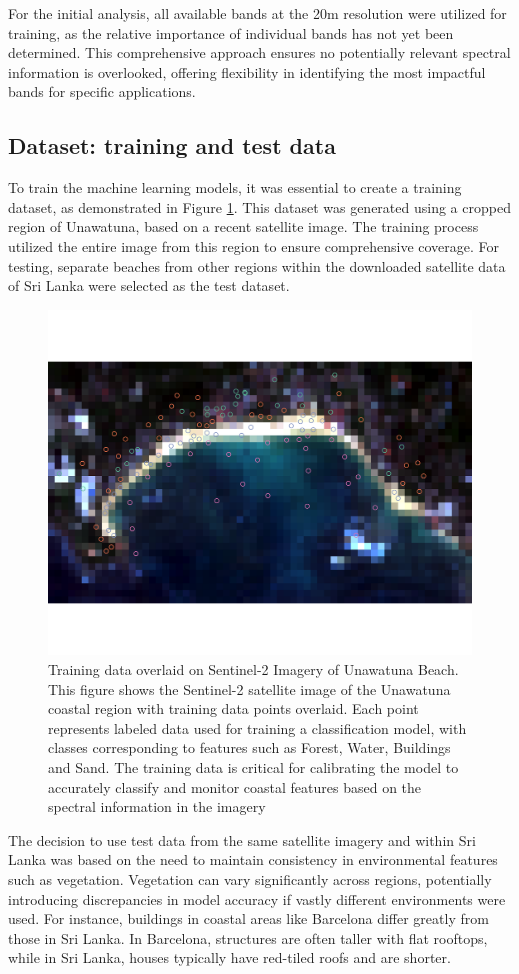 \documentclass[a4paper,12pt]{article}
\begin{document}
For the initial analysis, all available bands at the 20m resolution were utilized for training, as the relative importance of individual bands has not yet been determined. This comprehensive approach ensures no potentially relevant spectral information is overlooked, offering flexibility in identifying the most impactful bands for specific applications.
\subsection{Dataset: training and test data}
To train the machine learning models, it was essential to create a training dataset, as demonstrated in Figure \ref{fig:labels}. This dataset was generated using a cropped region of Unawatuna, based on a recent satellite image. The training process utilized the entire image from this region to ensure comprehensive coverage. For testing, separate beaches from other regions within the downloaded satellite data of Sri Lanka were selected as the test dataset.
\begin{figure}[H]
    \centering
    \includegraphics[width=0.7\linewidth]{Unawantuna_Copernicushub/Labbeling.png}
    \caption[Training data overlaid on Sentinel-2 Imagery of Unawatuna Beach]{Training data overlaid on Sentinel-2 Imagery of Unawatuna Beach. This figure shows the Sentinel-2 satellite image of the Unawatuna coastal region with training data points overlaid. Each point represents labeled data used for training a classification model, with classes corresponding to features such as Forest, Water, Buildings and Sand. The training data is critical for calibrating the model to accurately classify and monitor coastal features based on the spectral information in the imagery}
    \label{fig:labels}
\end{figure}
The decision to use test data from the same satellite imagery and within Sri Lanka was based on the need to maintain consistency in environmental features such as vegetation. Vegetation can vary significantly across regions, potentially introducing discrepancies in model accuracy if vastly different environments were used. For instance, buildings in coastal areas like Barcelona differ greatly from those in Sri Lanka. In Barcelona, structures are often taller with flat rooftops, while in Sri Lanka, houses typically have red-tiled roofs and are shorter.\\
\end{document}
